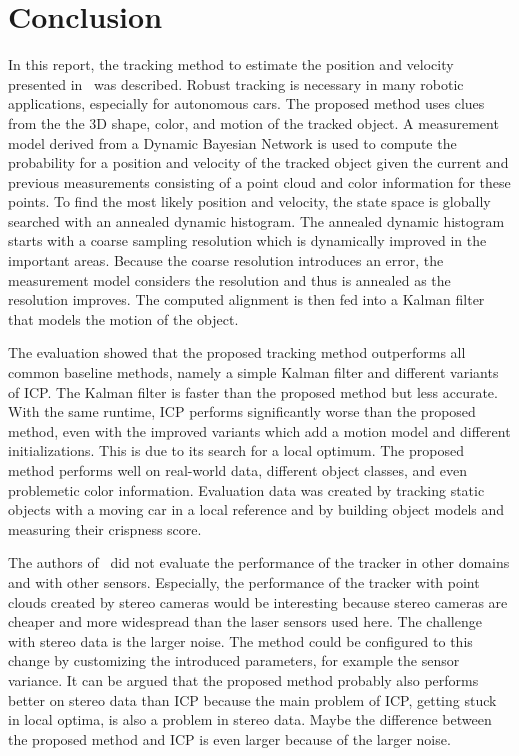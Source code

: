 \documentclass[twoside,a4paper,article]{combine}
\begin{document}
\section{Conclusion}
\label{sec:conclusion}
In this report, the tracking method to estimate the position and
velocity presented in~\cite{paper} was described. Robust tracking is
necessary in many robotic applications, especially for autonomous
cars. The proposed method uses clues from the the 3D shape, color, and
motion of the tracked object. A measurement model derived from a
Dynamic Bayesian Network is used to compute the probability for a
position and velocity of the tracked object given the current and
previous measurements consisting of a point cloud and color information
for these points.  To find the most likely position and velocity, the
state space is globally searched with an annealed dynamic
histogram. The annealed dynamic histogram starts with a coarse
sampling resolution which is dynamically improved in the important
areas. Because the coarse resolution introduces an error, the
measurement model considers the resolution and thus is annealed as the
resolution improves.  The computed alignment is then fed into a Kalman
filter that models the motion of the object.

The evaluation showed that the proposed tracking method outperforms
all common baseline methods, namely a simple Kalman filter and
different variants of ICP. The Kalman filter is faster than the
proposed method but less accurate. With the same runtime, ICP performs
significantly worse than the proposed method, even with the improved
variants which add a motion model and different initializations. This
is due to its search for a local optimum.
The proposed method performs well on real-world data, different object
classes, and even problemetic color information.
Evaluation data was created by tracking static objects with a moving car in
a local reference and by building object models and measuring their
crispness score.

The authors of~\cite{paper} did not evaluate the performance of the
tracker in other domains and with other sensors. Especially, the
performance of the tracker with point clouds created by stereo cameras
would be interesting because stereo cameras are cheaper and more
widespread than the laser sensors used here. The challenge with stereo
data is the larger noise. The method could be configured to this
change by customizing the introduced parameters, for example the
sensor variance. It can be argued that the proposed method probably
also performs better on stereo data than ICP because the main problem
of ICP, getting stuck in local optima, is also a problem in stereo
data. Maybe the difference between the proposed method and ICP is even
larger because of the larger noise.
\end{document}
